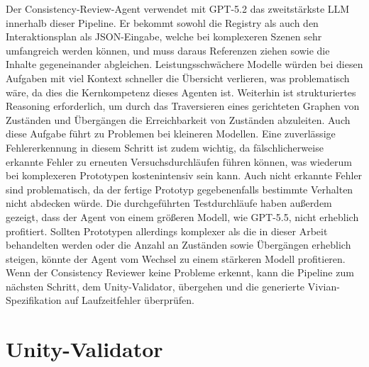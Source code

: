 Der Consistency-Review-Agent verwendet mit GPT-5.2 das zweitstärkste LLM innerhalb dieser Pipeline. Er bekommt sowohl die Registry als auch den Interaktionsplan als JSON-Eingabe, welche bei komplexeren Szenen sehr umfangreich werden können, und muss daraus Referenzen ziehen sowie die Inhalte gegeneinander abgleichen. Leistungsschwächere Modelle würden bei diesen Aufgaben mit viel Kontext schneller die Übersicht verlieren, was problematisch wäre, da dies die Kernkompetenz dieses Agenten ist. Weiterhin ist strukturiertes Reasoning erforderlich, um durch das Traversieren eines gerichteten Graphen von Zuständen und Übergängen die Erreichbarkeit von Zuständen abzuleiten. Auch diese Aufgabe führt zu Problemen bei kleineren Modellen. Eine zuverlässige Fehlererkennung in diesem Schritt ist zudem wichtig, da fälschlicherweise erkannte Fehler zu erneuten Versuchsdurchläufen führen können, was wiederum bei komplexeren Prototypen kostenintensiv sein kann. Auch nicht erkannte Fehler sind problematisch, da der fertige Prototyp gegebenenfalls bestimmte Verhalten nicht abdecken würde. Die durchgeführten Testdurchläufe haben außerdem gezeigt, dass der Agent von einem größeren Modell, wie GPT-5.5, nicht erheblich profitiert. Sollten Prototypen allerdings komplexer als die in dieser Arbeit behandelten werden oder die Anzahl an Zuständen sowie Übergängen erheblich steigen, könnte der Agent vom Wechsel zu einem stärkeren Modell profitieren.
Wenn der Consistency Reviewer keine Probleme erkennt, kann die Pipeline zum nächsten Schritt, dem Unity-Validator, übergehen und die generierte Vivian-Spezifikation auf Laufzeitfehler überprüfen.




\section{Unity-Validator}\label{sec:unity_validator}

